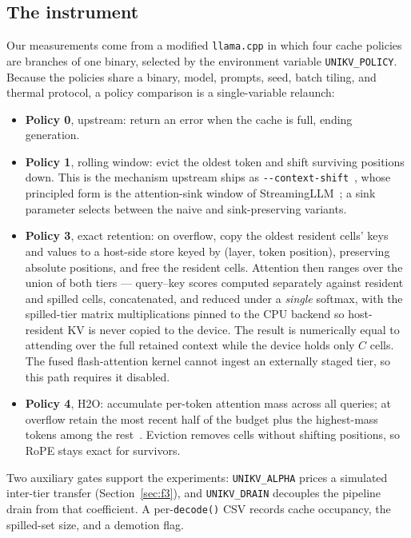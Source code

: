 \documentclass[manuscript,anonymous,review]{acmart}
\begin{document}
\subsection{The instrument}
\label{sec:instrument}

Our measurements come from a modified \texttt{llama.cpp} in which four
cache policies are branches of one binary, selected by the environment
variable \texttt{UNIKV\_POLICY}. Because the policies share a binary,
model, prompts, seed, batch tiling, and thermal protocol, a policy
comparison is a single-variable relaunch:

\begin{itemize}
  \item \textbf{Policy 0}, upstream: return an error when the cache is
    full, ending generation.
  \item \textbf{Policy 1}, rolling window: evict the oldest token and
    shift surviving positions down. This is the mechanism upstream
    ships as \texttt{-{}-context-shift}~\cite{llamacpp_contextshift},
    whose principled form is the attention-sink window of
    StreamingLLM~\cite{xiao2024streamingllm}; a sink parameter selects
    between the naive and sink-preserving variants.
  \item \textbf{Policy 3}, exact retention: on overflow, copy the
    oldest resident cells' keys and values to a host-side store keyed
    by (layer, token position), preserving absolute positions, and free
    the resident cells. Attention then ranges over the union of both
    tiers --- query--key scores computed separately against resident
    and spilled cells, concatenated, and reduced under a
    \emph{single} softmax, with the spilled-tier matrix multiplications
    pinned to the CPU backend so host-resident KV is never copied to
    the device. The result is numerically equal to attending over the
    full retained context while the device holds only $C$ cells. The
    fused flash-attention kernel cannot ingest an externally staged
    tier, so this path requires it disabled.
  \item \textbf{Policy 4}, H2O: accumulate per-token attention mass
    across all queries; at overflow retain the most recent half of the
    budget plus the highest-mass tokens among the
    rest~\cite{zhang2023h2o}. Eviction removes cells without shifting
    positions, so RoPE stays exact for survivors.
\end{itemize}

Two auxiliary gates support the experiments: \texttt{UNIKV\_ALPHA}
prices a simulated inter-tier transfer (Section~\ref{sec:f3}), and
\texttt{UNIKV\_DRAIN} decouples the pipeline drain from that
coefficient. A per-\texttt{decode()} CSV records cache occupancy, the
spilled-set size, and a demotion flag.
\end{document}
